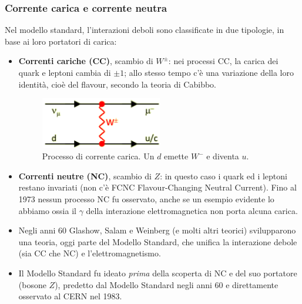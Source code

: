 \subsubsection{Corrente carica e corrente neutra}
Nel modello standard, l'interazioni deboli sono classificate in due tipologie, in base ai loro portatori di carica:
\begin{itemize}
    \item \textbf{Correnti cariche (CC)}, scambio di $W^\pm$: nei processi CC, la carica dei quark e leptoni cambia di $\pm1$; allo stesso tempo c'è una variazione della loro identità, cioè del flavour, secondo la teoria di Cabibbo.
    \begin{figure}[H]
        \centering
        \includegraphics[width=0.5\textwidth]{immagini/fig_cc_process.png}
        \caption{Processo di corrente carica. Un $d$ emette $W^-$ e diventa $u$.}
    \end{figure}
    \item \textbf{Correnti neutre (NC)}, scambio di $Z$: in questo caso i quark ed i leptoni restano invariati (non c'è FCNC Flavour-Changing Neutral Current). Fino al 1973 nessun processo NC fu osservato, anche se un esempio evidente lo abbiamo ossia il $\gamma$ della interazione elettromagnetica non porta alcuna carica.
    \item Negli anni 60 Glashow, Salam e Weinberg (e molti altri teorici) svilupparono una teoria, oggi parte del Modello Standard, che unifica la interazione debole (sia CC che NC) e l'elettromagnetismo.
    \item Il Modello Standard fu ideato \textit{prima} della scoperta di NC e del suo portatore (bosone $Z$), predetto dal Modello Standard negli anni 60 e direttamente osservato al CERN nel 1983.
\end{itemize}
